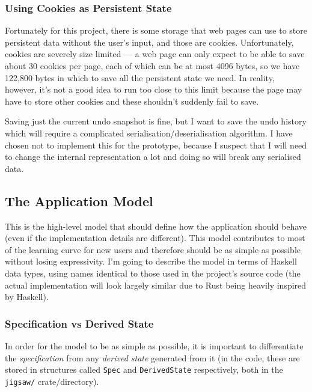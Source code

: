 \documentclass[12pt]{article}
\begin{document}
\subsubsection{Using Cookies as Persistent State}

Fortunately for this project, there is some storage that web pages can use to store persistent data
without the user's input, and those are cookies.  Unfortunately, cookies are severely size limited
--- a web page can only expect to be able to save about 30 cookies per page, each of which can be at
most 4096 bytes, so we have 122,800 bytes in which to save all the persistent state we need.  In
reality, however, it's not a good idea to run too close to this limit because the page may have to
store other cookies and these shouldn't suddenly fail to save.

Saving just the current undo snapshot is fine, but I want to save the undo history which will
require a complicated serialisation/deserialisation algorithm.  I have chosen not to implement this
for the prototype, because I suspect that I will need to change the internal representation a lot
and doing so will break any serialised data.

\subsection{The Application Model}

This is the high-level model that should define how the application should behave (even if the
implementation details are different).  This model contributes to most of the learning curve for new
users and therefore should be as simple as possible without losing expressivity.  I'm going to
describe the model in terms of Haskell data types, using names identical to those used in the
project's source code (the actual implementation will look largely similar due to Rust being heavily
inspired by Haskell).

\subsubsection{Specification vs Derived State}

In order for the model to be as simple as possible, it is important to differentiate the
\emph{specification} from any \emph{derived state} generated from it (in the code, these are stored
in structures called \verb|Spec| and \verb|DerivedState| respectively, both in the \verb|jigsaw/|
crate/directory).
\end{document}
